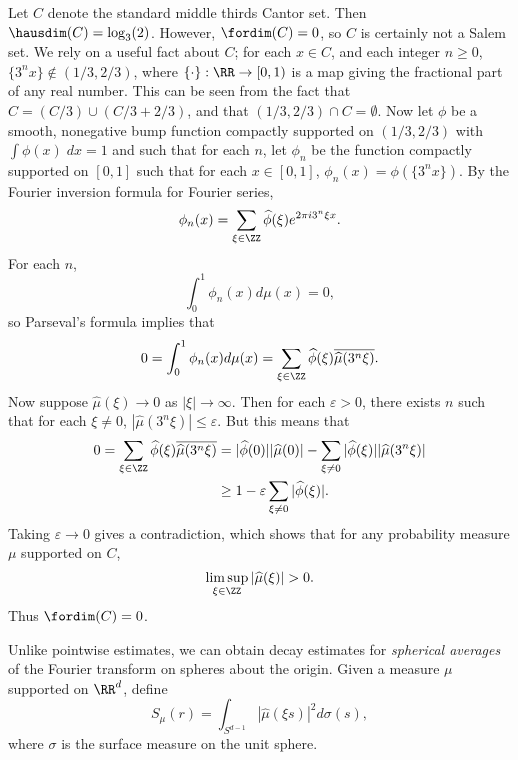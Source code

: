 \begin{example}
	Let $C$ denote the standard middle thirds Cantor set. Then $\hausdim(C) = \log_3(2)$. However, $\fordim(C) = 0$, so $C$ is certainly not a Salem set. We rely on a useful fact about $C$; for each $x \in C$, and each integer $n \geq 0$, $\{ 3^n x \} \not \in (1/3,2/3)$, where $\{ \cdot \}: \RR \to [0,1)$ is a map giving the fractional part of any real number. This can be seen from the fact that $C = (C/3) \cup (C/3 + 2/3)$, and that $(1/3,2/3) \cap C = \emptyset$. Now let $\phi$ be a smooth, nonegative bump function compactly supported on $(1/3,2/3)$ with $\int \phi(x)\; dx = 1$ and such that for each $n$, let $\phi_n$ be the function compactly supported on $[0,1]$ such that for each $x \in [0,1]$, $\phi_n(x) = \phi \left( \{ 3^n x \} \right)$. By the Fourier inversion formula for Fourier series,
	\[ \phi_n(x) = \sum_{\xi \in \ZZ} \widehat{\phi}(\xi) e^{2 \pi i 3^n \xi x}. \]
	For each $n$,
	\[ \int_0^1 \phi_n(x) d\mu(x) = 0, \]
	so Parseval's formula implies that
	\[ 0 = \int_0^1 \phi_n(x) d\mu(x) = \sum_{\xi \in \ZZ} \widehat{\phi}(\xi) \overline{\widehat{\mu}(3^n \xi)}. \]
	Now suppose $\widehat{\mu}(\xi) \to 0$ as $|\xi| \to \infty$. Then for each $\varepsilon > 0$, there exists $n$ such that for each $\xi \neq 0$, $|\widehat{\mu}(3^n \xi)| \leq \varepsilon$. But this means that
	\begin{align*}
		0 = \sum_{\xi \in \ZZ} \widehat{\phi}(\xi) \overline{\widehat{\mu}(3^n \xi)} &= |\widehat{\phi}(0)||\widehat{\mu}(0)| - \sum_{\xi \neq 0} |\widehat{\phi}(\xi)| |\widehat{\mu}(3^n \xi)|\\
		&\geq 1 - \varepsilon \sum_{\xi \neq 0} |\widehat{\phi}(\xi)|.
	\end{align*}
	Taking $\varepsilon \to 0$ gives a contradiction, which shows that for any probability measure $\mu$ supported on $C$,
	\[ \limsup_{\xi \in \ZZ} |\widehat{\mu}(\xi)| > 0. \]
	Thus $\fordim(C) = 0$.
\end{example}

Unlike pointwise estimates, we can obtain decay estimates for \emph{spherical averages} of the Fourier transform on spheres about the origin. Given a measure $\mu$ supported on $\RR^d$, define
%
\[ S_\mu(r) = \int_{S^{d-1}} |\widehat{\mu}(\xi s)|^2 d\sigma(s), \]
%
where $\sigma$ is the surface measure on the unit sphere.

